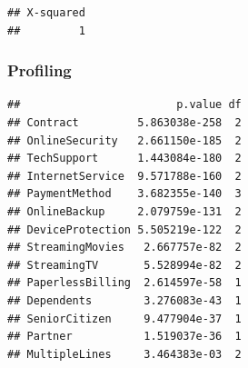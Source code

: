\documentclass[
  twoside]{article}
\newenvironment{Shaded}{\begin{snugshade}}{\end{snugshade}}
\newcommand{\AttributeTok}[1]{\textcolor[rgb]{0.77,0.63,0.00}{#1}}
\newcommand{\DecValTok}[1]{\textcolor[rgb]{0.00,0.00,0.81}{#1}}
\newcommand{\FunctionTok}[1]{\textcolor[rgb]{0.00,0.00,0.00}{#1}}
\newcommand{\NormalTok}[1]{#1}
\newcommand{\OtherTok}[1]{\textcolor[rgb]{0.56,0.35,0.01}{#1}}
\newcommand{\SpecialCharTok}[1]{\textcolor[rgb]{0.00,0.00,0.00}{#1}}
\begin{document}
\begin{verbatim}
## X-squared 
##         1
\end{verbatim}

\hypertarget{profiling}{%
\subsubsection{Profiling}\label{profiling}}

\begin{Shaded}
\end{Shaded}

\begin{verbatim}
##                        p.value df
## Contract         5.863038e-258  2
## OnlineSecurity   2.661150e-185  2
## TechSupport      1.443084e-180  2
## InternetService  9.571788e-160  2
## PaymentMethod    3.682355e-140  3
## OnlineBackup     2.079759e-131  2
## DeviceProtection 5.505219e-122  2
## StreamingMovies   2.667757e-82  2
## StreamingTV       5.528994e-82  2
## PaperlessBilling  2.614597e-58  1
## Dependents        3.276083e-43  1
## SeniorCitizen     9.477904e-37  1
## Partner           1.519037e-36  1
## MultipleLines     3.464383e-03  2
\end{verbatim}

\begin{Shaded}
\end{Shaded}
\end{document}
